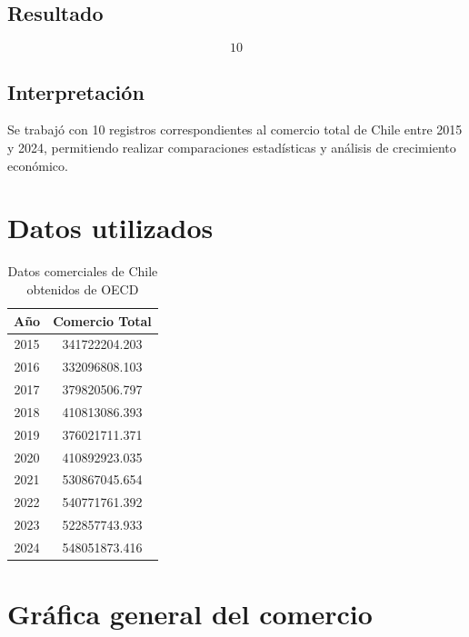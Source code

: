 \documentclass[12pt]{article}
\begin{document}
\subsection*{Resultado}

\[10\]

\subsection*{Interpretación}

Se trabajó con 10 registros correspondientes al comercio total de Chile entre 2015 y 2024, permitiendo realizar comparaciones estadísticas y análisis de crecimiento económico.


\section{Datos utilizados}

\begin{table}[H]
\centering
\begin{tabular}{cc}
\toprule
Año & Comercio Total \\
\midrule
2015 & 341722204.203 \\
2016 & 332096808.103 \\
2017 & 379820506.797 \\
2018 & 410813086.393 \\
2019 & 376021711.371 \\
2020 & 410892923.035 \\
2021 & 530867045.654 \\
2022 & 540771761.392 \\
2023 & 522857743.933 \\
2024 & 548051873.416 \\
\bottomrule
\end{tabular}
\caption{Datos comerciales de Chile obtenidos de OECD}
\end{table}


\section{Gráfica general del comercio}
\end{document}
